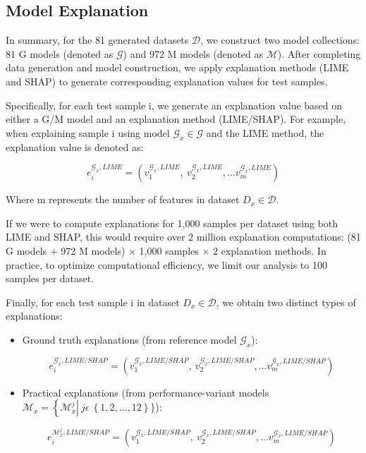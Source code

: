 \documentclass{article}
\begin{document}
\subsection{Model Explanation}

In summary, for the 81 generated datasets $\mathcal{D}$, we construct two model collections: 81 G models (denoted as $\mathcal{G}$) and 972 M models (denoted as $\mathcal{M}$). After completing data generation and model construction, we apply explanation methods (LIME and SHAP) to generate corresponding explanation values for test samples.

Specifically, for each test sample i, we generate an explanation value based on either a G/M model and an explanation method (LIME/SHAP). For example, when explaining sample i using model $\mathcal{G}_{x}\mathcal{\in G}$ and the LIME method, the explanation value is denoted as:

$$e_{i}^{\mathcal{G}_{x},LIME} = (v_{1}^{\mathcal{G}_{x},LIME},\ v_{2}^{\mathcal{G}_{x},LIME},\ldots v_{m}^{\mathcal{G}_{x},LIME})$$

Where m represents the number of features in dataset $D_{x}\mathcal{\in D}$.

If we were to compute explanations for 1,000 samples per dataset using both LIME and SHAP, this would require over 2 million explanation computations: (81 G models + 972 M models) × 1,000 samples × 2 explanation methods. In practice, to optimize computational efficiency, we limit our analysis to 100 samples per dataset.

Finally, for each test sample i in dataset $D_{x}\mathcal{\in D}$, we obtain two distinct types of explanations:

\begin{itemize}
    \item Ground truth explanations (from reference model $\mathcal{G}_{x}$):
    
    $$e_{i}^{\mathcal{G}_{x},LIME/SHAP} = (v_{1}^{\mathcal{G}_{x},LIME/SHAP},\ v_{2}^{\mathcal{G}_{x},LIME/SHAP},\ldots v_{m}^{\mathcal{G}_{x},LIME/SHAP})$$
    
    \item Practical explanations (from performance-variant models \\ \begin{math}\mathcal{M}_{x} = \left\{ \mathcal{M}_{x}^{j} \right|\ j\epsilon\ \left\{ 1,2,\ldots,12 \right\}\}\end{math}):
    
    $$e_{i}^{\mathcal{M}_{x}^{j},LIME/SHAP} = (v_{1}^{\mathcal{G}_{x},LIME/SHAP},\ v_{2}^{\mathcal{G}_{x},LIME/SHAP},\ldots v_{m}^{\mathcal{G}_{x},LIME/SHAP})$$
\end{itemize}
\end{document}
